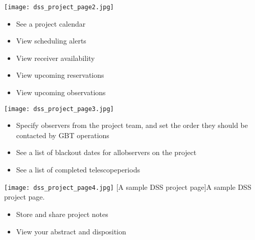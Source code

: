 \noindent\begin{minipage}{0.6\linewidth}
\texttt{[image: dss\_project\_page2.jpg]}
\end{minipage}\hfill
\begin{minipage}{0.385\linewidth}
\begin{itemize}[leftmargin=*]
\item See a project calendar
\item View scheduling alerts
\vspace{1.5mm}
\item View receiver availability  %
\vspace{9mm}
\item View upcoming reservations
\vspace{5mm}
\item View upcoming observations
\vspace{2.8cm}

\end{itemize}
\end{minipage}

\noindent\begin{minipage}{0.6\linewidth}
\texttt{[image: dss\_project\_page3.jpg]}
\end{minipage}\hfill
\begin{minipage}{0.385\linewidth}
\begin{itemize}[leftmargin=*,itemsep=0pt]
\vspace{5mm}
\item Specify observers from the project team, and set the order they should
      be contacted by \gls{GBT} operations
\vspace{1.3cm}
\item See a list of blackout dates for all\newline observers on the project
\item See a list of completed telescope\newline periods
\end{itemize}
\end{minipage}

\noindent\begin{minipage}{0.6\linewidth}
\setlength{\abovecaptionskip}{-5pt}
\texttt{[image: dss\_project\_page4.jpg]}
[A sample DSS project page]{A sample DSS project page.}
\label{fig:dss_project_page}
\end{minipage}\hfill
\begin{minipage}{0.385\linewidth}
\begin{itemize}[leftmargin=*]
\item Store and share project notes
\item View your abstract and disposition
\vspace{2.5cm}
\end{itemize}
\end{minipage}

